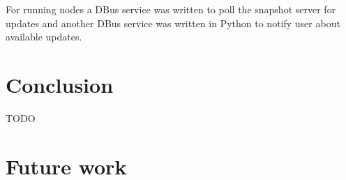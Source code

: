 \documentclass{article}
\begin{document}
For running nodes a DBus service was written to poll the snapshot server
for updates and another DBus service was written in Python to notify user
about available updates.


\section{Conclusion}

TODO

\section{Future work}



\end{document}

